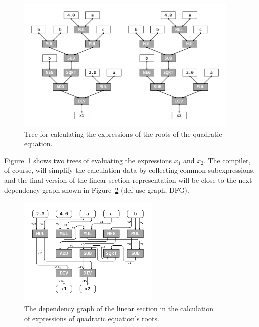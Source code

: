 \documentclass[
11pt,%
tightenlines,%
twoside,%
onecolumn,%
nofloats,%
nobibnotes,%
nofootinbib,%
superscriptaddress,%
noshowpacs,%
centertags]%
{revtex4}
\begin{document}
\begin{figure}[h]
\setcaptionmargin{5mm}
\includegraphics[width=0.95\textwidth]{pics/square_equation_calculation_tree.pdf}
\caption{Tree for calculating the expressions of the roots of the quadratic equation.}\label{fig:square_equation_calculation_tree}
\end{figure}

Figure~\ref{fig:square_equation_calculation_tree} shows two trees of evaluating the expressions $x_1$ and $x_2$.
The compiler, of course, will simplify the calculation data by collecting common subexpressions, and the final version of the linear section representation will be close to the next dependency graph shown in Figure~\ref{fig:def_use} (def-use graph, DFG).

\begin{figure}[h]
\setcaptionmargin{5mm}
\onelinecaptionsfalse %
\includegraphics[width=0.60\textwidth]{pics/def_use.pdf}
\caption{The dependency graph of the linear section in the calculation \\ of expressions of quadratic equation's roots.}\label{fig:def_use}
\end{figure}
\end{document}
